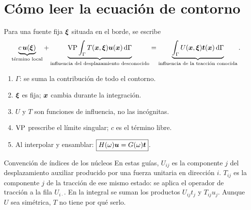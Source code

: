\documentclass[11pt]{article}
\begin{document}
\section*{Cómo leer la ecuación de contorno}
Para una fuente fija \(\bm{\xi}\) situada en el borde, se escribe
\[
 \underbrace{c\,\bm{u}(\bm{\xi})}_{\text{término local}}
 +\underbrace{\operatorname{VP}\int_\Gamma T(\bm{x},\bm{\xi})\bm{u}(\bm{x})\,\mathrm{d}\Gamma}
   _{\text{influencia del desplazamiento desconocido}}
 =\underbrace{\int_\Gamma U(\bm{x},\bm{\xi})\bm{t}(\bm{x})\,\mathrm{d}\Gamma}
   _{\text{influencia de la tracción conocida}}.
\]
\begin{enumerate}
 \item \(\Gamma\): se suma la contribución de todo el contorno.
 \item \(\bm{\xi}\) es fija; \(\bm{x}\) cambia durante la integración.
 \item \(U\) y \(T\) son funciones de influencia, no las incógnitas.
 \item \(\operatorname{VP}\) prescribe el límite singular; \(c\) es el término libre.
 \item Al interpolar y ensamblar:
 \(\boxed{H(\omega)\bm{u}=G(\omega)\bm{t}}\).
\end{enumerate}

\begin{idea}{Convención de índices de los núcleos}
En estas guías, \(U_{ij}\) es la componente \(j\) del desplazamiento
auxiliar producido por una fuerza unitaria en dirección \(i\).
\(T_{ij}\) es la componente \(j\) de la tracción de ese mismo estado:
se aplica el operador de tracción a la fila \(U_{i\cdot}\).
En la integral se suman los productos \(U_{ij}t_j\) y \(T_{ij}u_j\).
Aunque \(U\) sea simétrica, \(T\) no tiene por qué serlo.
\end{idea}
\end{document}
